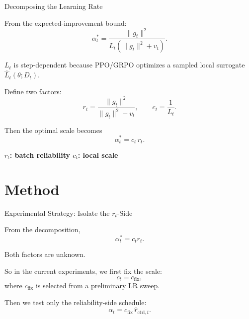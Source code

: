 \documentclass[aspectratio=169]{beamer}
\begin{document}
\begin{frame}{Decomposing the Learning Rate}
\small

From the expected-improvement bound:
\[
  \alpha_t^*
  =
  \frac{\|g_t\|^2}
       {L_t\left(\|g_t\|^2+v_t\right)} .
\]

\vspace{0.4em}

{\color{Muted}
\(L_t\) is step-dependent because PPO/GRPO optimizes a sampled local surrogate
\(\widehat L_t(\theta;D_t)\).
}

\vspace{1.0em}

Define two factors:
\[
  r_t
  =
  \frac{\|g_t\|^2}
       {\|g_t\|^2+v_t},
  \qquad
  c_t
  =
  \frac{1}{L_t}.
\]

\vspace{1.0em}

Then the optimal scale becomes
\[
  \boxed{
  \alpha_t^*
  =
  c_t\, r_t
  }.
\]

\vspace{0.7em}

\begin{center}
\large
\textbf{\(r_t\): batch reliability \qquad \(c_t\): local scale}
\end{center}

\end{frame}



\section{Method}

\begin{frame}{Experimental Strategy: Isolate the \(r_t\)-Side}
\small

From the decomposition,
\[
  \alpha_t^*
  =
  c_t r_t .
\]

\vspace{0.6em}

Both factors are unknown.



\vspace{0.9em}

So in the current experiments, we first fix the scale:
\[
  c_t = c_{\mathrm{fix}},
\]
where \(c_{\mathrm{fix}}\) is selected from a preliminary LR sweep.


Then we test only the reliability-side schedule:
\[
  \alpha_t
  =
  c_{\mathrm{fix}}\, \hat r_{\mathrm{ctrl},t}.
\]



\end{frame}
\end{document}
